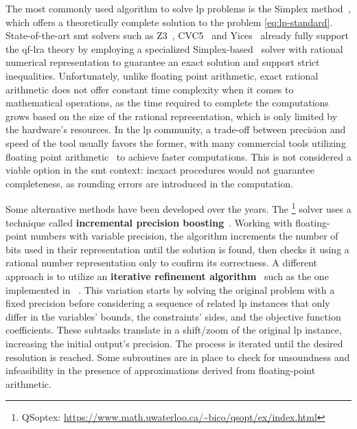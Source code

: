 \documentclass[runningheads]{llncs}
\begin{document}
The most commonly used algorithm to solve \gls{lp} problems is the Simplex method~\cite{dantzig1951maximization}, which offers a theoretically complete solution to the problem \eqref{eq:lp-standard}.
State-of-the-art \gls{smt} solvers such as Z3~\cite{ref:z3}, CVC5~\cite{ref:cvc5} and Yices~\cite{ref:yices} already fully support the \gls{qf-lra} theory
by employing a specialized Simplex-based~\cite{ref:lra-dpll-t} solver with rational numerical representation to guarantee an exact solution and support strict inequalities.
Unfortunately, unlike floating point arithmetic, exact rational arithmetic does not offer constant time complexity when it comes to mathematical operations,
as the time required to complete the computations grows based on the size of the rational representation, which is only limited by the hardware's resources.
In the \gls{lp} community, a trade-off between precision and speed of the tool usually favors the former, with many commercial tools utilizing floating point arithmetic~\cite{ref:gurobi} to achieve faster computations.
This is not considered a viable option in the \gls{smt} context: inexact procedures would not guarantee completeness, as rounding errors are introduced in the computation.

Some alternative methods have been developed over the years.
The \qsoptex\footnote{QSoptex: \url{https://www.math.uwaterloo.ca/~bico/qsopt/ex/index.html}} solver uses a technique called \textbf{incremental precision boosting}~\cite{ref:precision-boosting}.
Working with floating-point numbers with variable precision, the algorithm increments the number of bits used in their representation until the solution is found, then checks it using a rational number representation only to confirm its correctness.
A different approach is to utilize an \textbf{iterative refinement algorithm}~\cite{ref:iterative-refinement} such as the one implemented in \soplex~\cite{ref:soplex}.
This variation starts by solving the original problem with a fixed precision before considering a sequence of related \gls{lp} instances that only differ in the variables' bounds, the constraints' sides, and the objective function coefficients.
These subtasks translate in a shift/zoom of the original \gls{lp} instance, increasing the initial output's precision.
The process is iterated until the desired resolution is reached.
Some subroutines are in place to check for unsoundness and infeasibility in the presence of approximations derived from floating-point arithmetic.
\end{document}
